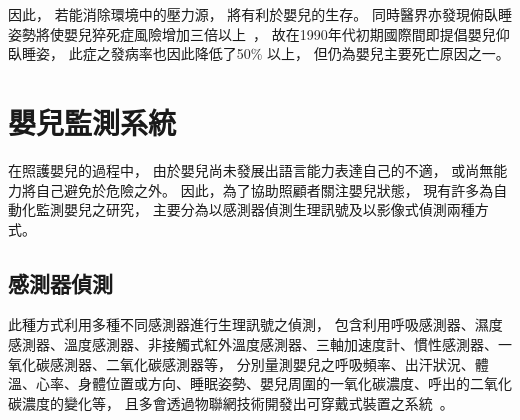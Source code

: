 \documentclass[class=NCU_thesis, crop=false]{standalone}
\begin{document}
因此，
若能消除環境中的壓力源，
將有利於嬰兒的生存。
同時醫界亦發現俯臥睡姿勢將使嬰兒猝死症風險增加三倍以上~\cite{willinger_infant_1994}，
故在1990年代初期國際間即提倡嬰兒仰臥睡姿，
此症之發病率也因此降低了50\% 以上，
但仍為嬰兒主要死亡原因之一。

\section{嬰兒監測系統}
在照護嬰兒的過程中，
由於嬰兒尚未發展出語言能力表達自己的不適，
或尚無能力將自己避免於危險之外。
因此，為了協助照顧者關注嬰兒狀態，
現有許多為自動化監測嬰兒之研究，
主要分為以感測器偵測生理訊號及以影像式偵測兩種方式。

\subsection{感測器偵測}
此種方式利用多種不同感測器進行生理訊號之偵測，
包含利用呼吸感測器、濕度感測器、溫度感測器、非接觸式紅外溫度感測器、三軸加速度計、慣性感測器、一氧化碳感測器、二氧化碳感測器等，
分別量測嬰兒之呼吸頻率、出汗狀況、體溫、心率、身體位置或方向、睡眠姿勢、嬰兒周圍的一氧化碳濃度、呼出的二氧化碳濃度的變化等，
且多會透過物聯網技術開發出可穿戴式裝置之系統~\cite{klingeberg_mobile_2012, zhou_low_2015, bouwstra_smart_2009, malhi_zigbee-based_2012}。
\end{document}
